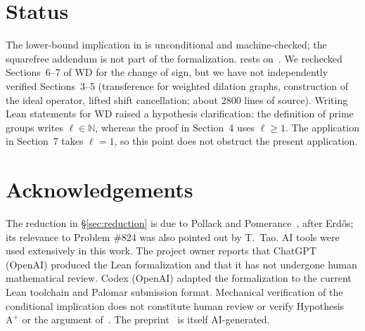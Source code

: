 \documentclass[11pt]{amsart}
\theoremstyle{definition}
\theoremstyle{remark}
\begin{document}
\section{Status}\label{sec:status}

The lower-bound implication in  is unconditional and machine-checked; the squarefree addendum is not part of the formalization.  rests on~\cite{WD}. We rechecked Sections~6--7 of WD for the change of sign, but we have not independently verified Sections~3--5 (transference for weighted dilation graphs, construction of the ideal operator, lifted shift cancellation; about 2800 lines of source). Writing Lean statements for WD raised a hypothesis clarification: the definition of prime groups writes $\ell\in\mathbb N$, whereas the proof in Section~4 uses $\ell\ge1$. The application in Section~7 takes $\ell=1$, so this point does not obstruct the present application.

\section*{Acknowledgements}
The reduction in \S\ref{sec:reduction} is due to Pollack and Pomerance~\cite{PP16}, after Erd\H{o}s; its relevance to Problem \#824 was also pointed out by T.~Tao. AI tools were used extensively in this work. The project owner reports that ChatGPT (OpenAI) produced the Lean formalization and that it has not undergone human mathematical review. Codex (OpenAI) adapted the formalization to the current Lean toolchain and Palomar submission format. Mechanical verification of the conditional implication does not constitute human review or verify Hypothesis~$\mathrm{A}^+$ or the argument of~\cite{WD}. The preprint~\cite{WD} is itself AI-generated.
\end{document}
